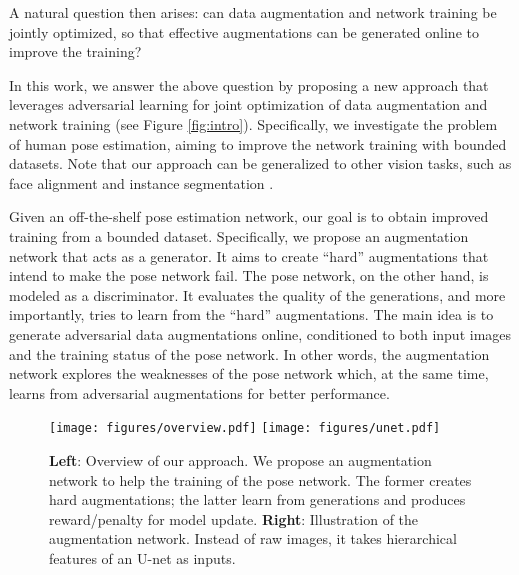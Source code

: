 \documentclass[10pt,twocolumn,letterpaper]{article}
\begin{document}
A natural question then arises: can data augmentation and network training be jointly optimized, so that effective augmentations can be generated online to improve the training?  %

In this work, we answer the above question by proposing a new approach that leverages adversarial learning for joint optimization of data augmentation and network training (see Figure \ref{fig:intro}). Specifically, we investigate the problem of human pose estimation, aiming to improve the network training with bounded datasets. Note that our approach can be generalized to other vision tasks, such as face alignment \cite{peng2016recurrent} and instance segmentation \cite{long2015fully, he2017maskrcnn}.

Given an off-the-shelf pose estimation network, our goal is to obtain improved training from a bounded dataset. Specifically, we propose an augmentation network that acts as a generator. It aims to create ``hard'' augmentations that intend to make the pose network fail. The pose network, on the other hand, is modeled as a discriminator. It evaluates the quality of the generations, and more importantly, tries to learn from the ``hard'' augmentations. The main idea is to generate adversarial data augmentations online, conditioned to both input images and the training status of the pose network. In other words, the augmentation network explores the weaknesses of the pose network which, at the same time, learns from adversarial augmentations for better performance.

\begin{figure*}[t!]
    \centering
  \texttt{[image: figures/overview.pdf]}
\endminipage
{}
    \centering
  \texttt{[image: figures/unet.pdf]}
\endminipage
\caption{{\bf Left}: Overview of our approach. We propose an augmentation network to help the training of the pose network. The former creates hard augmentations; the latter learn from generations and produces reward/penalty for model update. {\bf Right}: Illustration of the augmentation network. Instead of raw images, it takes hierarchical features of an U-net as inputs.}
\label{fig:overview}
\end{figure*}
\end{document}
